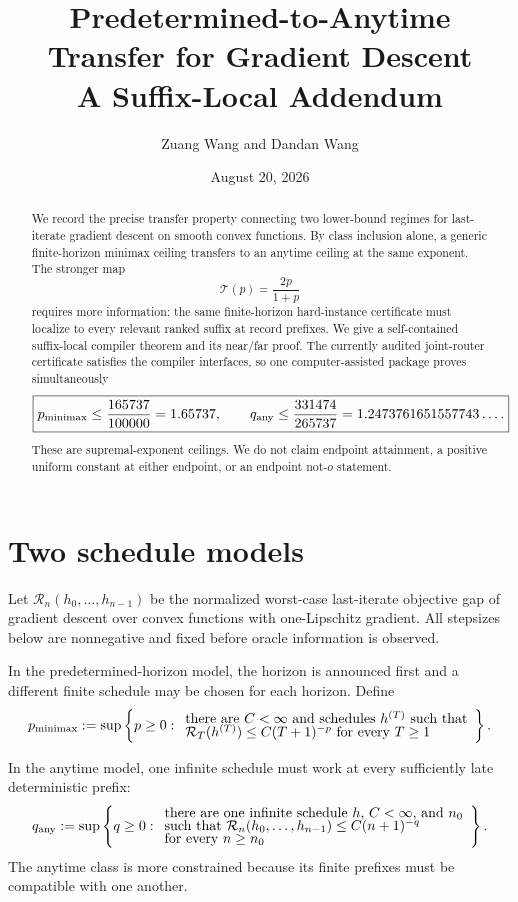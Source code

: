 \documentclass[11pt]{article}
\title{\bfseries
Predetermined-to-Anytime Transfer for Gradient Descent\\
\large A Suffix-Local Addendum}
\author{Zuang Wang and Dandan Wang}
\date{August 20, 2026}
\theoremstyle{remark}
\newcommand{\Risk}{\mathcal R}
\newcommand{\Transfer}{\mathcal T}
\begin{document}
\maketitle

\begin{abstract}
We record the precise transfer property connecting two lower-bound regimes
for last-iterate gradient descent on smooth convex functions.  By class
inclusion alone, a generic finite-horizon minimax ceiling transfers to an
anytime ceiling at the same exponent.  The stronger map
\[
 \Transfer(p)=\frac{2p}{1+p}
\]
requires more information: the same finite-horizon hard-instance certificate
must localize to every relevant ranked suffix at record prefixes.  We give a
self-contained suffix-local compiler theorem and its near/far proof.  The
currently audited joint-router certificate satisfies the compiler interfaces,
so one computer-assisted package proves simultaneously
\[
 \boxed{
 p_{\rm minimax}\le\frac{165737}{100000}=1.65737,
 \qquad
 q_{\rm any}\le\frac{331474}{265737}
 =1.2473761651557743\ldots .}
\]
These are supremal-exponent ceilings.  We do not claim endpoint attainment,
a positive uniform constant at either endpoint, or an endpoint
\(\mathrm{not}\text{-}o\) statement.
\end{abstract}

\section{Two schedule models}

Let \(\Risk_n(h_0,\ldots,h_{n-1})\) be the normalized worst-case
last-iterate objective gap of gradient descent over convex functions with
one-Lipschitz gradient.  All stepsizes below are nonnegative and fixed before
oracle information is observed.

In the predetermined-horizon model, the horizon is announced first and a
different finite schedule may be chosen for each horizon.  Define
\[
 p_{\rm minimax}:=\sup\left\{p\ge0:
 \begin{array}{l}
 \text{there are \(C<\infty\) and schedules \(h^{(T)}\) such that}\\[-1mm]
 \Risk_T(h^{(T)})\le C(T+1)^{-p}\text{ for every \(T\ge1\)}
 \end{array}\right\}.
\]

In the anytime model, one infinite schedule must work at every sufficiently
late deterministic prefix:
\[
 q_{\rm any}:=\sup\left\{q\ge0:
 \begin{array}{l}
 \text{there are one infinite schedule \(h\), \(C<\infty\), and \(n_0\)}\\[-1mm]
 \text{such that \(\Risk_n(h_0,\ldots,h_{n-1})\le C(n+1)^{-q}\)}\\[-1mm]
 \text{for every \(n\ge n_0\)}
 \end{array}\right\}.
\]
The anytime class is more constrained because its finite prefixes must be
compatible with one another.
\end{document}
